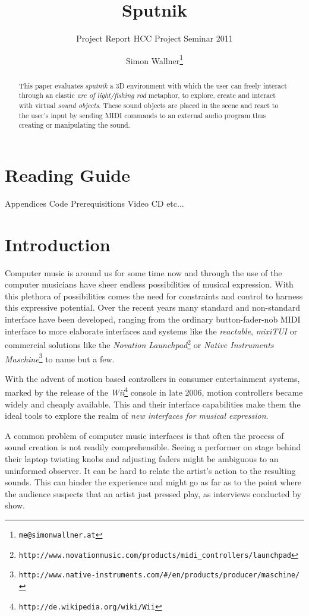 \documentclass[10pt,a4paper]{scrartcl}
\title{Sputnik}
\subtitle{Project Report HCC Project Seminar 2011}
\author{Simon Wallner\footnote{\texttt{me@simonwallner.at}}}
\begin{document}
\maketitle

\begin{abstract}
This paper evaluates \emph{sputnik} a 3D environment with which the user can freely interact through an elastic \emph{arc of light/fishing rod} metaphor, to explore, create and interact with virtual \emph{sound objects}. These sound objects are placed in the scene and react to the user's input by sending MIDI commands to an external audio program thus creating or manipulating the sound.

\end{abstract}

\section{Reading Guide}
Appendices
Code
Prerequisitions
Video
CD
etc...


\section{Introduction}

Computer music is around us for some time now and through the use of the computer musicians have sheer endless possibilities of musical expression. With this plethora of possibilities comes the need for constraints and control to harness this expressive potential. Over the recent years many standard and non-standard interface have been developed, ranging from the ordinary button-fader-nob MIDI interface to more elaborate interfaces and systems like the \emph{reactable}\cite{Jorda2007}, \emph{mixiTUI}\cite{Pedersen2009} or commercial solutions like the \emph{Novation Launchpad}\footnote{\texttt{http://www.novationmusic.com/products/midi\_controllers/launchpad}} or \emph{Native Instruments Maschine}\footnote{\texttt{http://www.native-instruments.com/\#/en/products/producer/maschine/}} to name but a few.

With the advent of motion based controllers in consumer entertainment systems, marked by the release of the \emph{Wii}\footnote{\texttt{http://de.wikipedia.org/wiki/Wii}} console in late 2006, motion controllers became widely and cheaply available. This and their interface capabilities make them the ideal tools to explore the realm of \emph{new interfaces for musical expression}.


A common problem of computer music interfaces is that often the process of sound creation is not readily comprehensible. Seeing a performer on stage behind their laptop twisting knobs and adjusting faders might be ambiguous to an uninformed observer. It can be hard to relate the artist's action to the resulting sounds. This can hinder the experience and might go as far as to the point where the audience suspects that an artist just pressed play, as interviews conducted by \cite{Pedersen2009} show.
\end{document}
